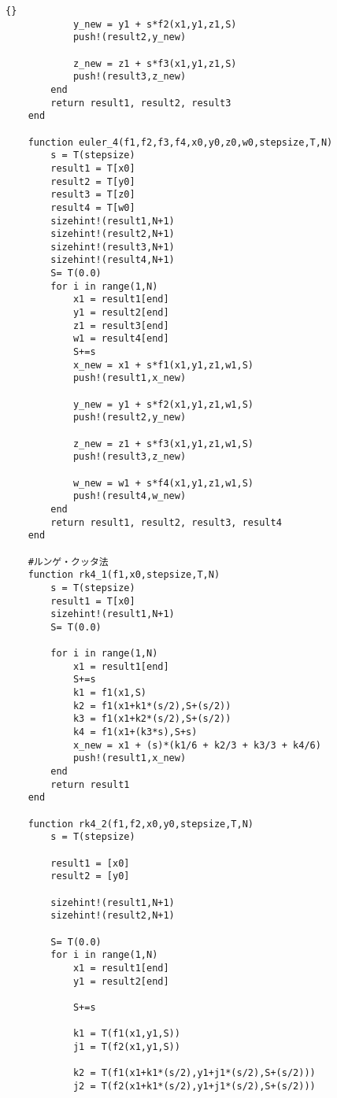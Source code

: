 \begin{lstlisting}[caption =\text{numerical\_scheme.jl}, label =code_numericalscheme]{}
            y_new = y1 + s*f2(x1,y1,z1,S)
            push!(result2,y_new)

            z_new = z1 + s*f3(x1,y1,z1,S)
            push!(result3,z_new)
        end
        return result1, result2, result3
    end

    function euler_4(f1,f2,f3,f4,x0,y0,z0,w0,stepsize,T,N)
        s = T(stepsize)
        result1 = T[x0]
        result2 = T[y0]
        result3 = T[z0] 
        result4 = T[w0]
        sizehint!(result1,N+1)
        sizehint!(result2,N+1)
        sizehint!(result3,N+1)
        sizehint!(result4,N+1)
        S= T(0.0)
        for i in range(1,N)
            x1 = result1[end]
            y1 = result2[end]
            z1 = result3[end]
            w1 = result4[end]
            S+=s
            x_new = x1 + s*f1(x1,y1,z1,w1,S)
            push!(result1,x_new)

            y_new = y1 + s*f2(x1,y1,z1,w1,S)
            push!(result2,y_new)

            z_new = z1 + s*f3(x1,y1,z1,w1,S)
            push!(result3,z_new)

            w_new = w1 + s*f4(x1,y1,z1,w1,S)
            push!(result4,w_new)
        end
        return result1, result2, result3, result4
    end

    #ルンゲ・クッタ法
    function rk4_1(f1,x0,stepsize,T,N)
        s = T(stepsize)
        result1 = T[x0]
        sizehint!(result1,N+1)
        S= T(0.0)

        for i in range(1,N)
            x1 = result1[end]
            S+=s
            k1 = f1(x1,S)
            k2 = f1(x1+k1*(s/2),S+(s/2))
            k3 = f1(x1+k2*(s/2),S+(s/2))
            k4 = f1(x1+(k3*s),S+s)
            x_new = x1 + (s)*(k1/6 + k2/3 + k3/3 + k4/6)
            push!(result1,x_new)
        end
        return result1
    end

    function rk4_2(f1,f2,x0,y0,stepsize,T,N)
        s = T(stepsize)

        result1 = [x0]
        result2 = [y0]

        sizehint!(result1,N+1)
        sizehint!(result2,N+1)

        S= T(0.0)
        for i in range(1,N)
            x1 = result1[end]
            y1 = result2[end]

            S+=s

            k1 = T(f1(x1,y1,S))
            j1 = T(f2(x1,y1,S))

            k2 = T(f1(x1+k1*(s/2),y1+j1*(s/2),S+(s/2)))
            j2 = T(f2(x1+k1*(s/2),y1+j1*(s/2),S+(s/2)))


\end{lstlisting}
